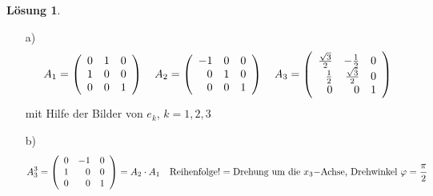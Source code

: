 \documentclass[10pt]{article}
\newtheorem{Lo}{L\"osung}
\newcommand{\VS}{\vspace{1cm}}
\begin{document}
\begin{sffamily}
\begin{Lo}  \end{Lo}
\begin{enumerate}
\item[a)]
\[
 A_1 =  \left(\begin{array}{r r r}
                                   0 & 1 & 0\\
                   1 & 0 & 0\\
                   0 & 0 & 1
                                \end{array}
\right)\quad
 A_2 =  \left(\begin{array}{r r r}
                                   -1 & 0 & 0\\
                   0 & 1 & 0\\
                   0 & 0 & 1
                                \end{array}
\right)\quad A_3 =  \left(\begin{array}{r r r}
                                   \frac{\sqrt{3}}{2} & -\frac{1}{2} & 0\\
                   \frac{1}{2} & \frac{\sqrt{3}}{2} & 0\\
                   0 & 0 & 1
                                \end{array}
\right)
\]
mit Hilfe der Bilder von $e_k$, $k = 1, 2, 3$ \item[b)]
\[
  A^3_3 = \left(\begin{array}{r r r}
                                   0 & -1 & 0\\
                   1 & 0 & 0\\
                   0 & 0 & 1
                                \end{array}
\right) = A_2\cdot A_1\quad\textrm{Reihenfolge!} = \textrm{Drehung
um die $x_3 - $Achse, Drehwinkel $\varphi = \frac{\pi}{2}$}
\]
\end{enumerate}


\end{sffamily}
\end{document}

